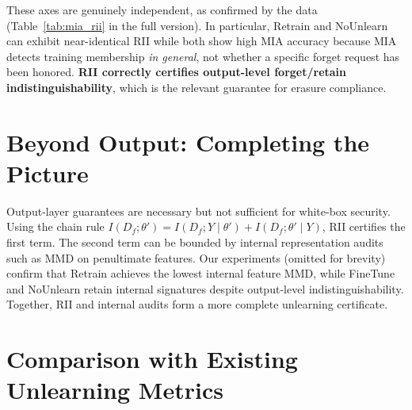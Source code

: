 \documentclass[journal]{IEEEtran}
\theoremstyle{definition}
\begin{document}
These axes are genuinely independent, as confirmed by the data (Table~\ref{tab:mia_rii} in the full version). In particular, Retrain and NoUnlearn can exhibit near-identical RII while both show high MIA accuracy because MIA detects training membership \emph{in general}, not whether a specific forget request has been honored. \textbf{RII correctly certifies output-level forget/retain indistinguishability}, which is the relevant guarantee for erasure compliance.

\section{Beyond Output: Completing the Picture}
\label{sec:threat}

Output-layer guarantees are necessary but not sufficient for white-box security. Using the chain rule $I(D_f;\theta') = I(D_f;Y\mid\theta') + I(D_f;\theta'\mid Y)$, RII certifies the first term. The second term can be bounded by internal representation audits such as MMD on penultimate features. Our experiments (omitted for brevity) confirm that Retrain achieves the lowest internal feature MMD, while FineTune and NoUnlearn retain internal signatures despite output-level indistinguishability. Together, RII and internal audits form a more complete unlearning certificate.

\section{Comparison with Existing Unlearning Metrics}
\label{sec:comparison}
\end{document}
